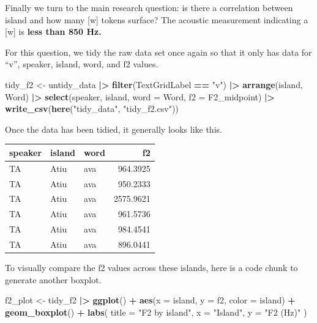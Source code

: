 \documentclass[
  ,man,floatsintext]{apa6}
\newenvironment{Shaded}{\begin{snugshade}}{\end{snugshade}}
\newcommand{\AttributeTok}[1]{\textcolor[rgb]{0.13,0.29,0.53}{#1}}
\newcommand{\FunctionTok}[1]{\textcolor[rgb]{0.13,0.29,0.53}{\textbf{#1}}}
\newcommand{\NormalTok}[1]{#1}
\newcommand{\OtherTok}[1]{\textcolor[rgb]{0.56,0.35,0.01}{#1}}
\newcommand{\SpecialCharTok}[1]{\textcolor[rgb]{0.81,0.36,0.00}{\textbf{#1}}}
\newcommand{\StringTok}[1]{\textcolor[rgb]{0.31,0.60,0.02}{#1}}
\begin{document}
Finally we turn to the main research question: is there a correlation between island and how many {[}w{]} tokens surface? The acoustic measurement indicating a {[}w{]} is \textbf{less than 850 Hz.}

For this question, we tidy the raw data set once again so that it only has data for ``v'', speaker, island, word, and f2 values.

\begin{Shaded}
\begin{Highlighting}[]
\NormalTok{tidy\_f2 }\OtherTok{\textless{}{-}}\NormalTok{ untidy\_data }\SpecialCharTok{|\textgreater{}}
  \FunctionTok{filter}\NormalTok{(TextGridLabel }\SpecialCharTok{==} \StringTok{"v"}\NormalTok{) }\SpecialCharTok{|\textgreater{}}
  \FunctionTok{arrange}\NormalTok{(island, Word) }\SpecialCharTok{|\textgreater{}}  
  \FunctionTok{select}\NormalTok{(speaker, island, }\AttributeTok{word =}\NormalTok{ Word, }\AttributeTok{f2 =}\NormalTok{ F2\_midpoint) }\SpecialCharTok{|\textgreater{}}
  \FunctionTok{write\_csv}\NormalTok{(}\FunctionTok{here}\NormalTok{(}\StringTok{"tidy\_data"}\NormalTok{, }\StringTok{"tidy\_f2.csv"}\NormalTok{))}
\end{Highlighting}
\end{Shaded}

Once the data has been tidied, it generally looks like this.

\begin{tabular}{l|l|l|r}
\hline
speaker & island & word & f2\\
\hline
TA & Atiu & ava & 964.3925\\
\hline
TA & Atiu & ava & 950.2333\\
\hline
TA & Atiu & ava & 2575.9621\\
\hline
TA & Atiu & ava & 961.5736\\
\hline
TA & Atiu & ava & 984.4541\\
\hline
TA & Atiu & ava & 896.0441\\
\hline
\end{tabular}

To visually compare the f2 values across these islands, here is a code chunk to generate another boxplot.

\begin{Shaded}
\begin{Highlighting}[]
\NormalTok{f2\_plot }\OtherTok{\textless{}{-}}\NormalTok{ tidy\_f2 }\SpecialCharTok{|\textgreater{}}
  \FunctionTok{ggplot}\NormalTok{() }\SpecialCharTok{+}
  \FunctionTok{aes}\NormalTok{(}\AttributeTok{x =}\NormalTok{ island, }\AttributeTok{y =}\NormalTok{ f2, }\AttributeTok{color =}\NormalTok{ island) }\SpecialCharTok{+}
  \FunctionTok{geom\_boxplot}\NormalTok{() }\SpecialCharTok{+}
  \FunctionTok{labs}\NormalTok{(}
    \AttributeTok{title =} \StringTok{"F2 by island"}\NormalTok{,}
    \AttributeTok{x =} \StringTok{"Island"}\NormalTok{,}
    \AttributeTok{y =} \StringTok{"F2 (Hz)"}
\NormalTok{  )}
\end{Highlighting}
\end{Shaded}
\end{document}
